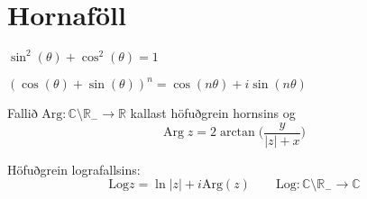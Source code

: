 \noindent
\section*{Hornaföll}


\begin{minipage}{.5\linewidth}
  $\sin^2(\theta) + \cos^2(\theta) =1$
\end{minipage}%
\begin{minipage}{.5\linewidth}
	$(\cos(\theta)+\sin(\theta))^n = \cos(n\theta)+i\sin(n\theta)$
\end{minipage}

\begin{minipage}{1\linewidth}
Fallið $\text{Arg} : \mathbb{C} \setminus \mathbb{R_{-}} \to \mathbb{R}$ kallast höfuðgrein hornsins og
\begin{equation*}
  \text{Arg} \; z = 2 \arctan \bigg(\frac{y}{|z| + x} \biggl)
\end{equation*}
\end{minipage}
%
\begin{minipage}{1\linewidth}
\noindent Höfuðgrein lografallsins:
\begin{equation*}
      \text{Log} z = \ln |z| + i \text{Arg}(z) \quad  \quad \text{Log}: \mathbb{C} \setminus \mathbb{R_{-}} \to \mathbb{C}
\end{equation*}
\end{minipage}
